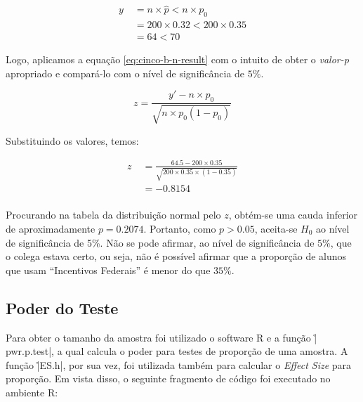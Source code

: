 \begin{align}
  \label{eq:cinco-a-y-correcao}
  y   &\; =  n \times \hat{p} < n \times p_0 \\ 
      &\; = 200 \times 0.32 < 200 \times 0.35 \nonumber \\
      &\; = 64 < 70 \nonumber
\end{align}

Logo, aplicamos a equação \ref{eq:cinco-b-n-result} com o intuito de obter o \textit{valor-p} 
apropriado e compará-lo com o nível de significância de $5\%$.

\begin{equation}
  \label{eq:cinco-b-n-result}
  z = \frac{y' - n \times p_0}{ \sqrt{n \times p_0 (1 - p_0)} }
\end{equation}

Substituindo os valores, temos:

\begin{align*}
  z &\;= \frac{64.5 - 200 \times 0.35}{ \sqrt{200 \times 0.35 \times (1 - 0.35)} } \\
    &\;= - 0.8154 \nonumber \\
\end{align*}

Procurando na tabela da distribuição normal pelo $z$, 
obtém-se uma cauda inferior de aproximadamente $p = 0.2074$.
Portanto, como $p > 0.05$, aceita-se $H_0$ ao nível de significância de 5\%. 
Não se pode afirmar, ao nível de significância de $5\%$, que o colega estava certo, ou seja, 
não é possível afirmar que a proporção de  alunos que usam ``Incentivos Federais'' é menor do que $35\%$.


\subsection{Poder do Teste}
\label{questao:3b}

Para obter o tamanho da amostra foi utilizado o software R e a função \r|pwr.p.test|, a qual calcula o poder para testes de proporção de uma amostra.
A função \r|ES.h|, por sua vez, foi utilizada também para calcular o \textit{Effect Size} para proporção.
Em vista disso, o seguinte fragmento de código foi executado no ambiente R:

